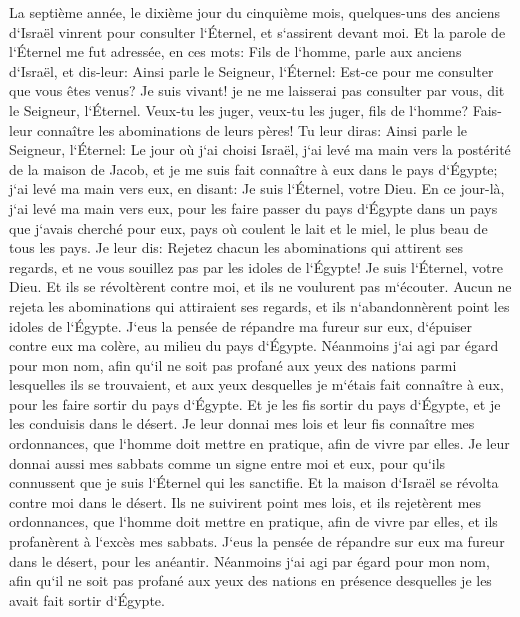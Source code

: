 \verse La septième année, le dixième jour du cinquième mois, quelques-uns des anciens d`Israël vinrent pour consulter l`Éternel, et s`assirent devant moi. 
\verse Et la parole de l`Éternel me fut adressée, en ces mots: 
\verse Fils de l`homme, parle aux anciens d`Israël, et dis-leur: Ainsi parle le Seigneur, l`Éternel: Est-ce pour me consulter que vous êtes venus? Je suis vivant! je ne me laisserai pas consulter par vous, dit le Seigneur, l`Éternel. 
\verse Veux-tu les juger, veux-tu les juger, fils de l`homme? Fais-leur connaître les abominations de leurs pères! 
\verse Tu leur diras: Ainsi parle le Seigneur, l`Éternel: Le jour où j`ai choisi Israël, j`ai levé ma main vers la postérité de la maison de Jacob, et je me suis fait connaître à eux dans le pays d`Égypte; j`ai levé ma main vers eux, en disant: Je suis l`Éternel, votre Dieu. 
\verse En ce jour-là, j`ai levé ma main vers eux, pour les faire passer du pays d`Égypte dans un pays que j`avais cherché pour eux, pays où coulent le lait et le miel, le plus beau de tous les pays. 
\verse Je leur dis: Rejetez chacun les abominations qui attirent ses regards, et ne vous souillez pas par les idoles de l`Égypte! Je suis l`Éternel, votre Dieu. 
\verse Et ils se révoltèrent contre moi, et ils ne voulurent pas m`écouter. Aucun ne rejeta les abominations qui attiraient ses regards, et ils n`abandonnèrent point les idoles de l`Égypte. J`eus la pensée de répandre ma fureur sur eux, d`épuiser contre eux ma colère, au milieu du pays d`Égypte. 
\verse Néanmoins j`ai agi par égard pour mon nom, afin qu`il ne soit pas profané aux yeux des nations parmi lesquelles ils se trouvaient, et aux yeux desquelles je m`étais fait connaître à eux, pour les faire sortir du pays d`Égypte. 
\verse Et je les fis sortir du pays d`Égypte, et je les conduisis dans le désert. 
\verse Je leur donnai mes lois et leur fis connaître mes ordonnances, que l`homme doit mettre en pratique, afin de vivre par elles. 
\verse Je leur donnai aussi mes sabbats comme un signe entre moi et eux, pour qu`ils connussent que je suis l`Éternel qui les sanctifie. 
\verse Et la maison d`Israël se révolta contre moi dans le désert. Ils ne suivirent point mes lois, et ils rejetèrent mes ordonnances, que l`homme doit mettre en pratique, afin de vivre par elles, et ils profanèrent à l`excès mes sabbats. J`eus la pensée de répandre sur eux ma fureur dans le désert, pour les anéantir. 
\verse Néanmoins j`ai agi par égard pour mon nom, afin qu`il ne soit pas profané aux yeux des nations en présence desquelles je les avait fait sortir d`Égypte. 

